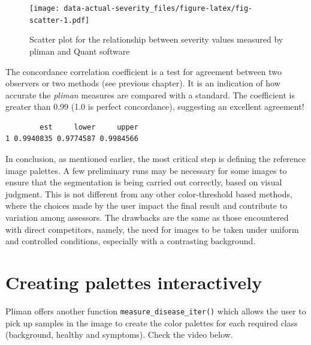 \documentclass[
  letterpaper,
]{book}
\newenvironment{Shaded}{\begin{snugshade}}{\end{snugshade}}
\newcommand{\FunctionTok}[1]{\textcolor[rgb]{0.28,0.35,0.67}{#1}}
\newcommand{\NormalTok}[1]{\textcolor[rgb]{0.00,0.23,0.31}{#1}}
\newcommand{\OtherTok}[1]{\textcolor[rgb]{0.00,0.23,0.31}{#1}}
\newcommand{\SpecialCharTok}[1]{\textcolor[rgb]{0.37,0.37,0.37}{#1}}
\begin{document}
\begin{figure}

\texttt{[image: data-actual-severity\_files/figure-latex/fig-scatter-1.pdf]} \hfill{}

\caption{\label{fig-scatter}Scatter plot for the relationship between
severity values measured by pliman and Quant software}

\end{figure}

The concordance correlation coefficient is a test for agreement between
two observers or two methods (see previous chapter). It is an indication
of how accurate the \emph{pliman} measures are compared with a standard.
The coefficient is greater than 0.99 (1.0 is perfect concordance),
suggesting an excellent agreement!

\begin{Shaded}
\end{Shaded}

\begin{verbatim}
        est     lower     upper
1 0.9940835 0.9774587 0.9984566
\end{verbatim}

In conclusion, as mentioned earlier, the most critical step is defining
the reference image palettes. A few preliminary runs may be necessary
for some images to ensure that the segmentation is being carried out
correctly, based on visual judgment. This is not different from any
other color-threshold based methods, where the choices made by the user
impact the final result and contribute to variation among assessors. The
drawbacks are the same as those encountered with direct competitors,
namely, the need for images to be taken under uniform and controlled
conditions, especially with a contrasting background.

\hypertarget{creating-palettes-interactively}{%
\section{Creating palettes
interactively}\label{creating-palettes-interactively}}

Pliman offers another function \texttt{measure\_disease\_iter()} which
allows the user to pick up samples in the image to create the color
palettes for each required class (background, healthy and symptoms).
Check the video below.
\end{document}

